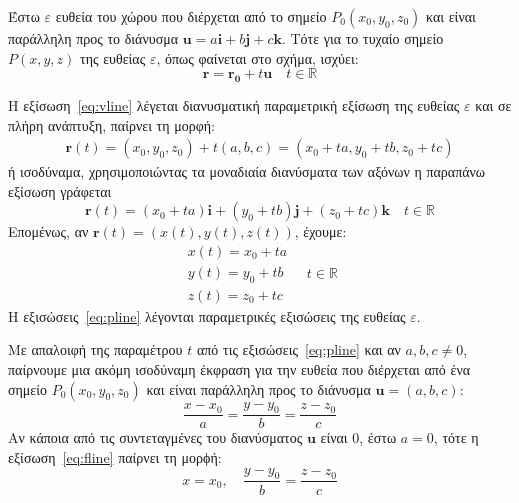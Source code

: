 Έστω $ \varepsilon $ ευθεία του χώρου που διέρχεται από το σημείο 
$ P_{0}(x_{0}, y_{0}, z_{0}) $ και είναι παράλληλη προς το διάνυσμα 
$ \mathbf{u} = a \mathbf{i} + b \mathbf{j} + c \mathbf{k} $. Τότε για το 
τυχαίο σημείο $ P(x,y,z) $ της ευθείας $ \varepsilon $, όπως φαίνεται στο σχήμα, ισχύει:
\begin{equation}\label{eq:vline}
  \mathbf{r} = \mathbf{r_{0}} + t \mathbf{u} \quad t \in \mathbb{R}
\end{equation}

Η εξίσωση~\eqref{eq:vline} λέγεται \textcolor{Col1}{διανυσματική παραμετρική} εξίσωση 
της ευθείας $ \varepsilon $  και σε πλήρη ανάπτυξη, παίρνει τη μορφή:
\begin{align*} 
  \mathbf{r}(t) = (x_{0}, y_{0}, z_{0}) + t (a, b, c) 
  = (x_{0} + t a, y_{0}+ t b, z_{0} + t c) 
\end{align*} 
ή ισοδύναμα, χρησιμοποιώντας τα μοναδιαία διανύσματα των αξόνων η παραπάνω εξίσωση
γράφεται
\[
  \boxed{\mathbf{r}(t) = (x_{0}+ t a) \mathbf{i} + (y_{0} + t b) \mathbf{j}+
  (z_{0}+ t c) \mathbf{k}} \quad t \in \mathbb{R} 
\]
Επομένως, αν $ \mathbf{r}(t) = (x(t), y(t), z(t)) $, έχουμε:
\begin{equation}\label{eq:pline}
  \boxed{
    \begin{matrix}
      x(t) = x_{0} + t a \\
      y(t) = y_{0} + t b \\
      z(t) = z_{0} + t c
    \end{matrix}
  } 
  \quad t \in \mathbb{R} 
\end{equation} 
Η εξισώσεις~\eqref{eq:pline} λέγονται \textcolor{Col1}{παραμετρικές εξισώσεις} της 
ευθείας $ \varepsilon $.

\begin{rem}
  Με απαλοιφή της παραμέτρου $t$ από τις εξισώσεις~\eqref{eq:pline} και αν 
  $ a, b, c \neq 0 $, παίρνουμε μια ακόμη ισοδύναμη έκφραση για την ευθεία που 
  διέρχεται από ένα σημείο $ P_{0}(x_{0}, y_{0}, z_{0}) $ και είναι παράλληλη προς το 
  διάνυσμα $ \mathbf{u} = (a,b,c) $:
  \begin{equation}\label{eq:fline}
    \boxed{\frac{x- x_{0}}{a} = \frac{y- y_{0}}{b} = \frac{z- z_{0}}{c}}
  \end{equation}
  Αν κάποια από τις συντεταγμένες του διανύσματος $ \mathbf{u} $ είναι 0, έστω $ a=0 $,
  τότε η εξίσωση~\eqref{eq:fline} παίρνει τη μορϕή:
  \[
    x = x_{0}, \quad \frac{y- y_{0}}{b} = \frac{z- z_{0}}{c}
  \]
\end{rem}


